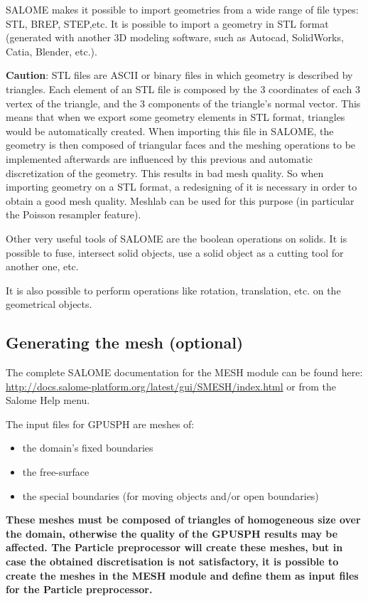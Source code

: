 \documentclass{../GPUSPHtemplate}
\begin{document}
SALOME makes it possible to import geometries from 
a wide range of file types: STL, BREP, STEP,etc. 
It is possible to import a geometry in STL format 
(generated with another 3D modeling software, such 
as Autocad, SolidWorks, Catia, Blender, etc.).

\textbf{Caution}: STL files are ASCII or binary 
files in which geometry is described by triangles. 
Each element of an STL file is composed by the 3 
coordinates of each 3 vertex of the triangle, 
and the 3 components of the triangle’s normal vector. 
This means that when we export some geometry 
elements in STL format, triangles would be automatically created. 
When importing this file in SALOME, the geometry is then 
composed of triangular faces and the meshing operations 
to be implemented afterwards are influenced by this previous 
and automatic discretization of the geometry.
This results in bad mesh quality.
So when importing geometry on a STL format, a redesigning of it is necessary 
in order to obtain a good mesh quality. Meshlab can be used for this purpose (in particular
the Poisson resampler feature).

Other very useful tools of SALOME are the boolean operations on solids.
It is possible to fuse, intersect solid objects, use a solid object as a 
cutting tool for another one, etc.

It is also possible to perform operations like rotation, translation, etc. on
the geometrical objects.

\subsection{Generating the mesh (optional)}

The complete SALOME documentation for the MESH module can be found here:
\url{http://docs.salome-platform.org/latest/gui/SMESH/index.html}
or from the Salome Help menu.

The input files for GPUSPH are meshes of:
\begin{itemize}
\item the domain's fixed boundaries
\item the free-surface
\item the special boundaries (for moving objects 
and/or open boundaries)
\end{itemize}
\textbf{These meshes must be composed of triangles of homogeneous size over the domain,
  otherwise the quality of the GPUSPH results may be affected.
  The Particle preprocessor will create these meshes, but
  in case the obtained discretisation is not satisfactory,
  it is possible to create the meshes in the MESH module
  and define them as input files for the Particle preprocessor.}
\end{document}
